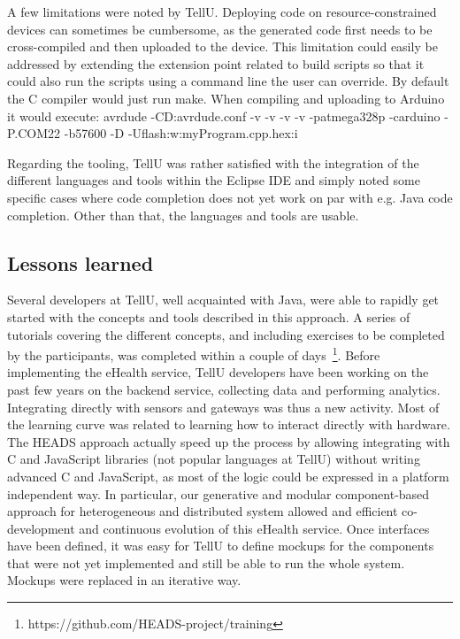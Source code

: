 A few limitations were noted by TellU. Deploying code on resource-constrained devices can sometimes be cumbersome, as the generated code first needs to be cross-compiled and then uploaded to the device. This limitation could easily be addressed by extending the extension point related to build scripts so that it could also run the scripts using a command line the user can override. By default the C compiler would just run make. When compiling and uploading to Arduino it would execute: avrdude -CD:avrdude.conf -v -v -v -v -patmega328p -carduino -P.COM22 -b57600 -D -Uflash:w:myProgram.cpp.hex:i 

Regarding the tooling, TellU was rather satisfied with the integration of the different languages and tools within the Eclipse IDE and simply noted some specific cases where code completion does not yet work on par with e.g. Java code completion. Other than that, the languages and tools are usable.

\subsection{Lessons learned}
Several developers at TellU, well acquainted with Java, were able to rapidly get started with the concepts and tools described in this approach. A series of tutorials covering the different concepts, and including exercises to be completed by the participants, was completed within a couple of days~\footnote{https://github.com/HEADS-project/training}. Before implementing the eHealth service, TellU developers have been working on the past few years on the backend service, collecting data and performing analytics. Integrating directly with sensors and gateways was thus a new activity. Most of the learning curve was related to learning how to interact directly with hardware. The HEADS approach actually speed up the process by allowing integrating with C and JavaScript libraries (not popular languages at TellU) without writing advanced C and JavaScript, as most of the logic could be expressed in a platform independent way. In particular, our generative and modular component-based approach for heterogeneous and distributed system allowed and efficient co-development and continuous evolution of this eHealth service. Once interfaces have been defined, it was easy for TellU to define mockups for the components that were not yet implemented and still be able to run the whole system. Mockups were replaced in an iterative way.

